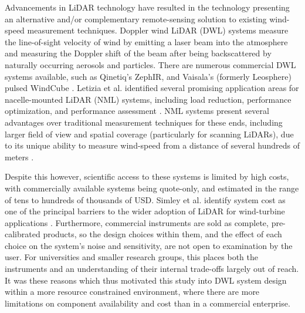 Advancements in LiDAR technology have resulted in the technology presenting an alternative and/or complementary remote-sensing solution to existing wind-speed measurement techniques. Doppler wind LiDAR (DWL) systems measure the line-of-sight velocity of wind by emitting a laser beam into the atmosphere and measuring the Doppler shift of the beam after being backscattered by naturally occurring aerosols and particles. There are numerous commercial DWL systems available, such as Qinetiq's ZephIR, and Vaisala's (formerly Leosphere) pulsed WindCube \cite{hill_remote_nodate} \cite{cariou_leosphere_nodate}. Letizia et al. identified several promising application areas for nacelle-mounted LiDAR (NML) systems, including load reduction, performance optimization, and performance assessment \cite{letizia_characterization_2023}. NML systems present several advantages over traditional measurement techniques for these ends, including larger field of view and spatial coverage (particularly for scanning LiDARs), due to its unique ability to measure wind-speed from a distance of several hundreds of meters \cite{letizia_characterization_2023}.

Despite this however, scientific access to these systems is limited by high
costs, with commercially available systems being quote-only, and estimated in the range of tens to hundreds of thousands of USD. Simley et al. identify system cost as one of the principal barriers to the wider adoption of LiDAR for wind-turbine applications \cite{simley_optimizing_2018}. Furthermore, commercial instruments are sold as complete, pre-calibrated products, so the design choices within them, and the effect of each choice on the system's noise and sensitivity, are not open to examination by the user. For universities and smaller research groups, this places both the instruments and an understanding of their internal trade-offs largely out of reach. It was these reasons which thus motivated this study into DWL system design within a more resource constrained environment, where there are more limitations on component availability and cost than in a commercial enterprise.

 
